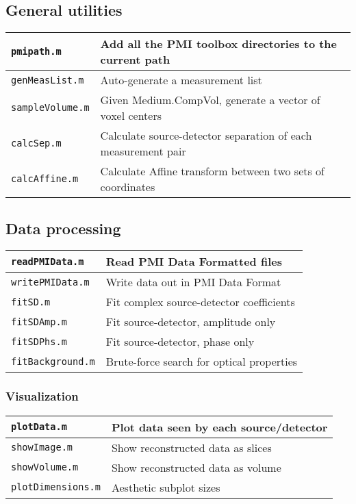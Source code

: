 \documentclass[12pt]{article}
\newcommand{\pmifile}[1]{{\tt #1}}
\begin{document}
\subsection{General utilities}

\begin{tabular}{|l|l|}
\hline
\pmifile{pmipath.m}      & Add all the PMI toolbox directories to the
				current path \\ \hline 
\pmifile{genMeasList.m}  & Auto-generate a measurement list \\ \hline
\pmifile{sampleVolume.m} & Given Medium.CompVol, generate a vector of
				voxel centers \\ \hline
\pmifile{calcSep.m}      & Calculate source-detector separation of each
				measurement pair \\ \hline 
\pmifile{calcAffine.m}   & Calculate Affine transform between two sets of
				coordinates \\ \hline
\end{tabular}

\subsection{Data processing}

\begin{tabular}{|l|l|}
\hline
\pmifile{readPMIData.m}   & Read PMI Data Formatted files \\ \hline
\pmifile{writePMIData.m}  & Write data out in PMI Data Format \\ \hline
\pmifile{fitSD.m}         & Fit complex source-detector coefficients \\ \hline
\pmifile{fitSDAmp.m}      & Fit source-detector, amplitude only \\ \hline
\pmifile{fitSDPhs.m}      & Fit source-detector, phase only \\ \hline
\pmifile{fitBackground.m} & Brute-force search for optical properties \\ \hline
\end{tabular}

\subsubsection{Visualization}

\begin{tabular}{|l|l|}
\hline
\pmifile{plotData.m}       & Plot data seen by each source/detector \\ \hline
\pmifile{showImage.m}      & Show reconstructed data as slices \\ \hline
\pmifile{showVolume.m}     & Show reconstructed data as volume \\ \hline
\pmifile{plotDimensions.m} & Aesthetic subplot sizes \\ \hline
\end{tabular}
\end{document}
